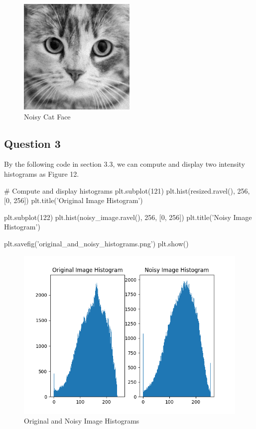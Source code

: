 \documentclass[12pt]{article}
\begin{document}
\begin{figure}[H]
  \centering
  \includegraphics[width=0.5\textwidth]{noisy_cat_face.jpg}
  \caption{Noisy Cat Face}
  \label{fig:example}
\end{figure}

\subsection{Question 3}
\quad By the following code in section 3.3, we can compute and display two intensity histograms as Figure 12.

\begin{python}
  # Compute and display histograms
plt.subplot(121)
plt.hist(resized.ravel(), 256, [0, 256])
plt.title('Original Image Histogram')

plt.subplot(122)
plt.hist(noisy_image.ravel(), 256, [0, 256])
plt.title('Noisy Image Histogram')

plt.savefig('original_and_noisy_histograms.png')
plt.show()
\end{python}

\begin{figure}[H]
  \centering
  \includegraphics[width=1.0\textwidth]{original_and_noisy_histograms.png}
  \caption{Original and Noisy Image Histograms}
  \label{fig:example}
\end{figure}
\end{document}
